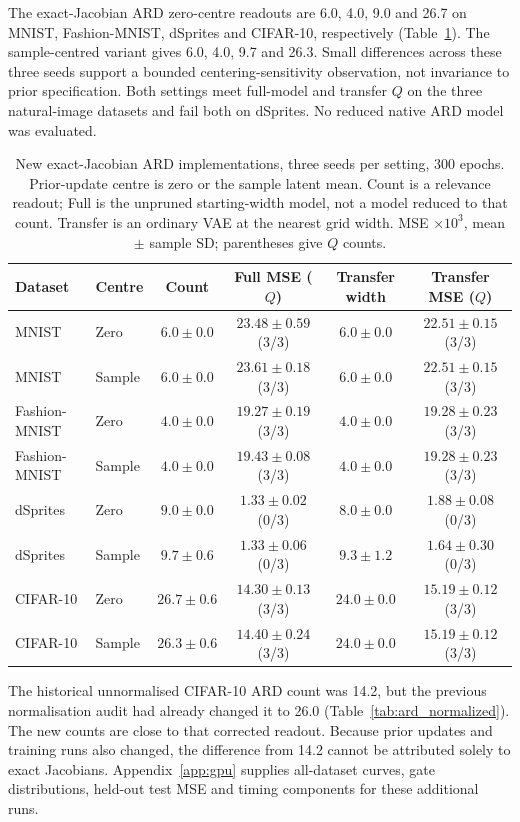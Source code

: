 \documentclass[make,article,submit,pdftex,moreauthors]{Definitions/mdpi}
\begin{document}
The exact-Jacobian ARD zero-centre readouts are 6.0, 4.0, 9.0 and 26.7
on MNIST, Fashion-MNIST, dSprites and CIFAR-10, respectively
(Table~\ref{tab:ardnew}). The sample-centred variant gives 6.0, 4.0, 9.7
and 26.3. Small differences across these three seeds support a bounded
centering-sensitivity observation, not invariance to prior specification.
Both settings meet full-model and transfer $Q$ on the three natural-image
datasets and fail both on dSprites. No reduced native ARD model was evaluated.
\begin{table}[H]
\caption{New exact-Jacobian ARD implementations, three seeds per setting, 300 epochs. Prior-update centre is zero or the sample latent mean. Count is a relevance readout; Full is the unpruned starting-width model, not a model reduced to that count. Transfer is an ordinary VAE at the nearest grid width. MSE $\times10^3$, mean $\pm$ sample SD; parentheses give $Q$ counts.}\label{tab:ardnew}
\footnotesize
\setlength{\tabcolsep}{3pt}
\begin{tabular*}{\textwidth}{@{\extracolsep{\fill}}llcccc@{}}
\toprule
Dataset & Centre & Count & Full MSE ($Q$) & Transfer width & Transfer MSE ($Q$) \\
\midrule
MNIST & Zero & $6.0 \pm 0.0$ & $23.48 \pm 0.59$ (3/3) & $6.0 \pm 0.0$ & $22.51 \pm 0.15$ (3/3) \\
MNIST & Sample & $6.0 \pm 0.0$ & $23.61 \pm 0.18$ (3/3) & $6.0 \pm 0.0$ & $22.51 \pm 0.15$ (3/3) \\
Fashion-MNIST & Zero & $4.0 \pm 0.0$ & $19.27 \pm 0.19$ (3/3) & $4.0 \pm 0.0$ & $19.28 \pm 0.23$ (3/3) \\
Fashion-MNIST & Sample & $4.0 \pm 0.0$ & $19.43 \pm 0.08$ (3/3) & $4.0 \pm 0.0$ & $19.28 \pm 0.23$ (3/3) \\
dSprites & Zero & $9.0 \pm 0.0$ & $1.33 \pm 0.02$ (0/3) & $8.0 \pm 0.0$ & $1.88 \pm 0.08$ (0/3) \\
dSprites & Sample & $9.7 \pm 0.6$ & $1.33 \pm 0.06$ (0/3) & $9.3 \pm 1.2$ & $1.64 \pm 0.30$ (0/3) \\
CIFAR-10 & Zero & $26.7 \pm 0.6$ & $14.30 \pm 0.13$ (3/3) & $24.0 \pm 0.0$ & $15.19 \pm 0.12$ (3/3) \\
CIFAR-10 & Sample & $26.3 \pm 0.6$ & $14.40 \pm 0.24$ (3/3) & $24.0 \pm 0.0$ & $15.19 \pm 0.12$ (3/3) \\
\bottomrule\end{tabular*}
\end{table}


The historical unnormalised CIFAR-10 ARD count was 14.2, but the
previous normalisation audit had already changed it to 26.0
(Table~\ref{tab:ard_normalized}). The new counts are close to that
corrected readout. Because prior updates and training runs also changed,
the difference from 14.2 cannot be attributed solely to exact Jacobians.
Appendix~\ref{app:gpu} supplies all-dataset curves, gate distributions,
held-out test MSE and timing components for these additional runs.
\end{document}

